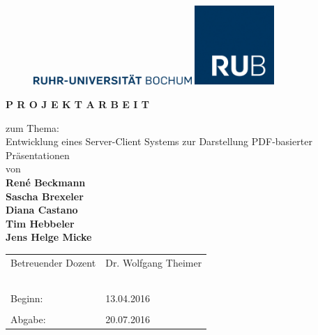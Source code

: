 \thispagestyle{empty}


\begin{figure}[t]
\vspace{-3cm}
\begin{minipage}[t]{3cm}
\vspace{-2cm}
\includegraphics[width=6cm]{Deckblatt/Wortmarke_RUB.jpg}
\end{minipage}
\hfill
\begin{minipage}[t]{3cm}
\includegraphics[width=3cm]{Deckblatt/Label_RUB.jpg}
\end{minipage}
\vspace{3cm}
\end{figure}


\renewcommand{\rmdefault}{phv}
\begin{center}


	{\Huge \bf P R O J E K T A R B E I T}
	
	\vspace{0.5cm}
	
	{\Large
	zum Thema:\\
	\vspace{0.5cm}
	Entwicklung eines Server-Client Systems zur Darstellung PDF-basierter Präsentationen\\
	\vspace{0.5cm}
	von\\
	\vspace{0.5cm}
	{\LARGE \bf
	René Beckmann\\
	Sascha Brexeler\\
	Diana Castano\\
	Tim Hebbeler\\
	Jens Helge Micke\\
	}
	\vspace{0.5cm}
	}
\end{center}

\begin{table}[h!]
\begin{tabular}{p{}p{}}
Betreuender Dozent & Dr. Wolfgang Theimer\\
&\\
&\\
&\\
&\\
&\\
Beginn: & 13.04.2016\\
&\\
Abgabe: & 20.07.2016\\
\end{tabular}
\end{table}

\renewcommand{\rmdefault}{ptm}
